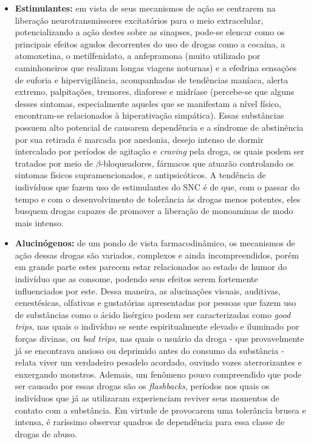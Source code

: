 \documentclass[
]{book}
\theoremstyle{definition}
\theoremstyle{definition}
\theoremstyle{definition}
\theoremstyle{definition}
\theoremstyle{remark}
\begin{document}
\begin{itemize}
\item
  \textbf{Estimulantes:} em vista de seus mecanismos de ação se centrarem na liberação neurotransmissores excitatórios para o meio extracelular, potencializando a ação destes sobre as sinapses, pode-se elencar como os principais efeitos agudos decorrentes do uso de drogas como a cocaína, a atomoxetina, o metilfenidato, a anfepramona (muito utilizado por caminhoneiros que realizam longas viagens noturnas) e a efedrina sensações de euforia e hipervigilância, acompanhadas de tendências maníaca, alerta extremo, palpitações, tremores, diaforese e midríase (percebe-se que alguns desses sintomas, especialmente aqueles que se manifestam a nível físico, encontram-se relacionados à hiperativação simpática). Essas substâncias possuem alto potencial de causarem dependência e a síndrome de abstinência por sua retirada é marcada por anedonia, desejo intenso de dormir intercalado por períodos de agitação e \emph{craving} pela droga, os quais podem ser tratados por meio de \(\beta\)-bloqueadores, fármacos que atuarão controlando os sintomas físicos supramencionados, e antipsicóticos. A tendência de indivíduos que fazem uso de estimulantes do SNC é de que, com o passar do tempo e com o desenvolvimento de tolerância às drogas menos potentes, eles busquem drogas capazes de promover a liberação de monoaminas de modo mais intenso.
\item
  \textbf{Alucinógenos:} de um pondo de vista farmacodinâmico, os mecanismos de ação dessas drogas são variados, complexos e ainda incompreendidos, porém em grande parte estes parecem estar relacionados ao estado de humor do indivíduo que as consome, podendo seus efeitos serem fortemente influenciados por este. Dessa maneira, as alucinações visuais, auditivas, cenestésicas, olfativas e gustatórias apresentadas por pessoas que fazem uso de substâncias como o ácido lisérgico podem ser caracterizadas como \emph{good trips}, nas quais o indivíduo se sente espiritualmente elevado e iluminado por forças divinas, ou \emph{bad trips}, nas quais o usuário da droga - que provavelmente já se encontrava ansioso ou deprimido antes do consumo da substância - relata viver um verdadeiro pesadelo acordado, ouvindo vozes aterrorizantes e enxergando monstros. Ademais, um fenômeno pouco compreendido que pode ser causado por essas drogas são os \emph{flashbacks}, períodos nos quais os indivíduos que já as utilizaram experienciam reviver seus momentos de contato com a substância. Em virtude de provocarem uma tolerância brusca e intensa, é raríssimo observar quadros de dependência para essa classe de drogas de abuso.
\end{itemize}
\end{document}
